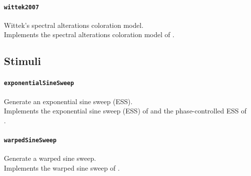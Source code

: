 \documentclass[11pt, oneside]{article}
\newcommand{\function}[1]{\paragraph*{\texttt{#1}}}
\begin{document}
\function{wittek2007} Wittek's spectral alterations coloration model. \\
Implements the spectral alterations coloration model of \citet{Wittek2007}.

\subsection{Stimuli}

\function{exponentialSineSweep} Generate an exponential sine sweep (ESS). \\
Implements the exponential sine sweep (ESS) of \citet{Farina2000} and the phase-controlled ESS of \citet{VetterdiRosario2011}.

\function{warpedSineSweep} Generate a warped sine sweep. \\
Implements the warped sine sweep of \citet{OchiaiKaneda2013}.



\end{document}
